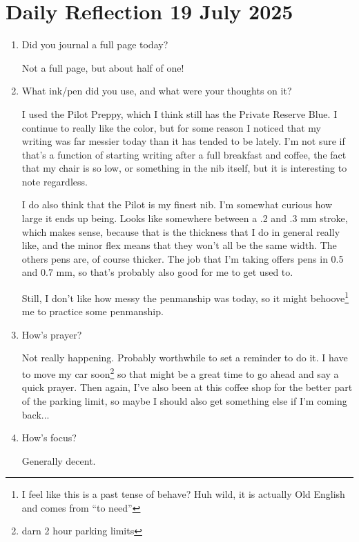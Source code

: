 \documentclass[12pt]{article}
\newcommand{\say}[1]{``#1''}
\renewcommand{\,}{\textsuperscript{,}}
\begin{document}
\section{Daily Reflection 19 July 2025}

\begin{enumerate}

\item Did you journal a full page today?

Not a full page, but about half of one!

\item What ink/pen did you use, and what were your thoughts on it?

I used the Pilot Preppy, which I think still has the Private Reserve Blue.  
I continue to really like the color, but for some reason I noticed that my writing was far messier today than it has tended to be lately.  
I'm not sure if that's a function of starting writing after a full breakfast and coffee, the fact that my chair is so low, or something in the nib itself, but it is interesting to note regardless.

I do also think that the Pilot is my finest nib. I'm somewhat curious how large it ends up being.  
Looks like somewhere between a .2 and .3 mm stroke, which makes sense, because that is the thickness that I do in general really like, and the minor flex means that they won't all be the same width.  
The others pens are, of course thicker.  
The job that I'm taking offers pens in 0.5 and 0.7 mm, so that's probably also good for me to get used to.

Still, I don't like how messy the penmanship was today, so it might behoove\footnote{I feel like this is a past tense of behave? Huh wild, it is actually Old English and comes from \say{to need}} me to practice some penmanship.

\item How's prayer?

Not really happening. Probably worthwhile to set a reminder to do it.  
I have to move my car soon\footnote{darn 2 hour parking limits} so that might be a great time to go ahead and say a quick prayer.  
Then again, I've also been at this coffee shop for the better part of the parking limit, so maybe I should also get something else if I'm coming back...

\item How's focus?

Generally decent.


\end{enumerate}
\end{document}
